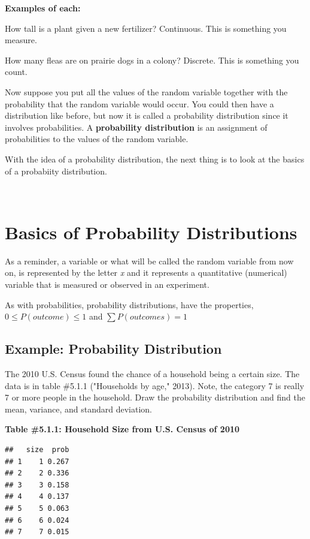 \documentclass[
]{book}
\begin{document}
\textbf{Examples of each:}

How tall is a plant given a new fertilizer? Continuous. This is something you measure.

How many fleas are on prairie dogs in a colony? Discrete. This is something you count.

Now suppose you put all the values of the random variable together with the probability that the random variable would occur. You could then have a distribution like before, but now it is called a probability distribution since it involves probabilities. A \textbf{probability distribution} is an assignment of probabilities to the values of the random variable.

With the idea of a probability distribution, the next thing is to look at the basics of a probabiity distribution.

\emph{\\
}

\hypertarget{basics-of-probability-distributions}{%
\section{Basics of Probability Distributions}\label{basics-of-probability-distributions}}

As a reminder, a variable or what will be called the random variable from now on, is represented by the letter \emph{x} and it represents a quantitative (numerical) variable that is measured or observed in an experiment.

As with probabilities, probability distributions, have the properties, \(0 \le P(outcome)\le1\) and \(\sum{P(outcomes)}=1\)

\hypertarget{example-probability-distribution}{%
\subsection{Example: Probability Distribution}\label{example-probability-distribution}}

The 2010 U.S. Census found the chance of a household being a certain size. The data is in table \#5.1.1 ("Households by age," 2013). Note, the category 7 is really 7 or more people in the household. Draw the probability distribution and find the mean, variance, and standard deviation.

\textbf{Table \#5.1.1: Household Size from U.S. Census of 2010}

\begin{verbatim}
##   size  prob
## 1    1 0.267
## 2    2 0.336
## 3    3 0.158
## 4    4 0.137
## 5    5 0.063
## 6    6 0.024
## 7    7 0.015
\end{verbatim}
\end{document}
